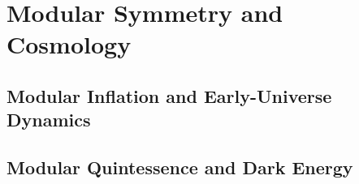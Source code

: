 \section{Modular Symmetry and Cosmology}

\subsection{Modular Inflation and Early-Universe Dynamics}


\subsection{Modular Quintessence and Dark Energy}

